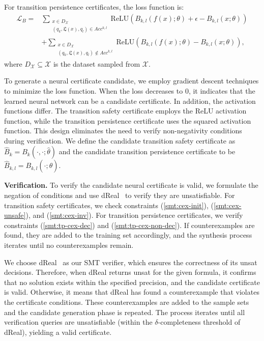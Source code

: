 For transition persistence certificates, the loss function is:
\begin{align}
\mathcal{L}_B = &\sum_{\substack{x \in D_{\mathcal{X}} \\ (q_k, \mathfrak{L}(x), q_l) \in Acc^{k,l}}} \text{ReLU}(B_{k,l}(f(x); \theta) + \epsilon - B_{k,l}(x; \theta)) \\
&+ \sum_{\substack{x \in D_{\mathcal{X}} \\ (q_k, \mathfrak{L}(x), q_l) \not\in Acc^{k,l}}} \text{ReLU}(B_{k,l}(f(x); \theta) - B_{k,l}(x; \theta)),
\end{align}
where $D_{\mathcal{X}} \subseteq \mathcal{X}$ is the dataset sampled from $\mathcal{X}$.

To generate a neural certificate candidate, we employ gradient descent techniques to minimize the loss function. When the loss decreases to 0, it indicates that the learned neural network can be a candidate certificate. In addition, the activation functions differ. The transition safety certificate employs the ReLU activation function, while the transition persistence certificate uses the squared activation function. This design eliminates the need to verify non-negativity conditions during verification. We define the candidate transition safety certificate as $\hat{B}_{k} = B_{k}(\cdot, \cdot; \hat{\theta})$ and the candidate transition persistence certificate to be $\hat{B}_{k,l} = B_{k,l}(\cdot; \hat{\theta})$.

\textbf{Verification.} To verify the candidate neural certificate is valid, we formulate the negation of conditions and use dReal~\cite{gao2013dreal} to verify they are unsatisfiable. For transition safety certificates, we check constraints (\ref{smt:cex-init}), (\ref{smt:cex-unsafe}), and (\ref{smt:cex-inv}). For transition persistence certificates, we verify constraints (\ref{smt:tp-cex-dec}) and (\ref{smt:tp-cex-non-dec}). If counterexamples are found, they are added to the training set accordingly, and the synthesis process iterates until no counterexamples remain.

We choose dReal~\cite{gao2013dreal} as our SMT verifier, which ensures the correctness of its unsat decisions. Therefore, when dReal returns unsat for the given formula, it confirms that no solution exists within the specified precision, and the candidate certificate is valid. Otherwise, it means that dReal has found a counterexample that violates the certificate conditions. These counterexamples are added to the sample sets and the candidate generation phase is repeated. The process iterates until all verification queries are unsatisfiable (within the $\delta$-completeness threshold of dReal), yielding a valid certificate.

